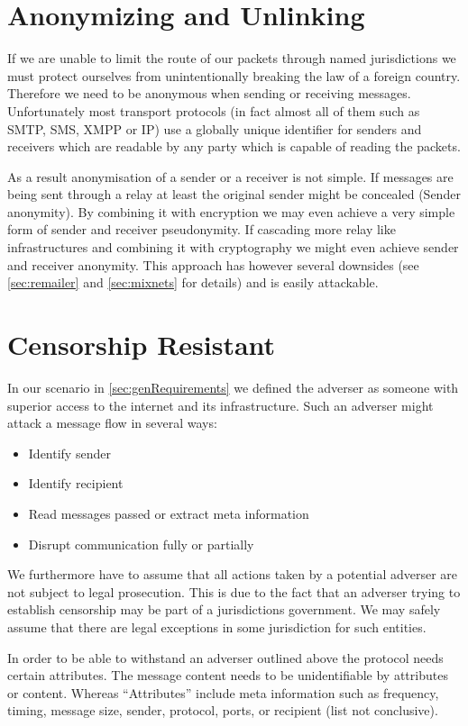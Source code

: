 \section{Anonymizing and Unlinking}
If we are unable to limit the route of our packets through named jurisdictions we must protect ourselves from unintentionally breaking the law of a foreign country. Therefore we need to be anonymous when sending or receiving messages. Unfortunately most transport protocols (in fact almost all of them such as SMTP, SMS, XMPP or IP) use a globally unique identifier for senders and receivers which are readable by any party which is capable of reading the packets. 

As a result anonymisation of a sender or a receiver is not simple. If messages are being sent through a relay at least the original sender might be concealed (Sender anonymity). By combining it with encryption we may even achieve a very simple form of sender and receiver pseudonymity. If cascading more relay like infrastructures and combining it with cryptography we might even achieve sender and receiver anonymity. This approach has however several downsides (see \ref{sec:remailer} and \ref{sec:mixnets} for details) and is easily attackable.

\section{Censorship Resistant}
In our scenario in \ref{sec:genRequirements} we defined the adverser as someone with superior access to the internet and its infrastructure. Such an adverser might attack a message flow in several ways:
\begin{itemize}
	\item Identify sender
	\item Identify recipient
	\item Read messages passed or extract meta information
	\item Disrupt communication fully or partially
\end{itemize}

We furthermore have to assume that all actions taken by a potential adverser are not subject to legal prosecution. This is due to the fact that an adverser trying to establish censorship may be part of a jurisdictions government. We may safely assume that there are legal exceptions in some jurisdiction for such entities.

In order to be able to withstand an adverser outlined above the protocol needs certain attributes. The message content needs to be unidentifiable by attributes or content. Whereas ``Attributes'' include meta information such as frequency, timing, message size, sender, protocol, ports, or recipient (list not conclusive).


